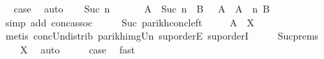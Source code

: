 \begin{isabellebody}
\ \isamarkupfalse%
\ {\isacharquery}{\kern0pt}case\ \isamarkupfalse%
\ auto\isanewline
{}\isamarkupfalse%
\isanewline
\ \ \isamarkupfalse%
\ {\isacharparenleft}{\kern0pt}Suc\ n{\isacharparenright}{\kern0pt}\isanewline
\ \ \isamarkupfalse%
\ \isamarkupfalse%
\ {\isachardoublequoteopen}{\isasymPsi}\ {\isacharparenleft}{\kern0pt}A\ {\isacharcircum}{\kern0pt}{\isacharcircum}{\kern0pt}\ {\isacharparenleft}{\kern0pt}Suc\ n{\isacharparenright}{\kern0pt}\ {\isacharat}{\kern0pt}{\isacharat}{\kern0pt}\ B{\isacharparenright}{\kern0pt}\ {\isasymsubseteq}\ {\isasymPsi}\ {\isacharparenleft}{\kern0pt}A\ {\isacharat}{\kern0pt}{\isacharat}{\kern0pt}\ A\ {\isacharcircum}{\kern0pt}{\isacharcircum}{\kern0pt}\ n\ {\isacharat}{\kern0pt}{\isacharat}{\kern0pt}B{\isacharparenright}{\kern0pt}{\isachardoublequoteclose}\isanewline
\ \ \ \ \isamarkupfalse%
\ {\isacharparenleft}{\kern0pt}simp\ add{\isacharcolon}{\kern0pt}\ conc{\isacharunderscore}{\kern0pt}assoc{\isacharparenright}{\kern0pt}\isanewline
\ \ \isamarkupfalse%
\ \isamarkupfalse%
\ Suc\ parikh{\isacharunderscore}{\kern0pt}conc{\isacharunderscore}{\kern0pt}left\ \isamarkupfalse%
\ {\isachardoublequoteopen}{\isasymdots}\ {\isasymsubseteq}\ {\isasymPsi}\ {\isacharparenleft}{\kern0pt}A\ {\isacharat}{\kern0pt}{\isacharat}{\kern0pt}\ X{\isacharparenright}{\kern0pt}{\isachardoublequoteclose}\isanewline
\ \ \ \ \isamarkupfalse%
\ {\isacharparenleft}{\kern0pt}metis\ conc{\isacharunderscore}{\kern0pt}Un{\isacharunderscore}{\kern0pt}distrib{\isacharparenleft}{\kern0pt}{}{\isacharparenright}{\kern0pt}\ parikh{\isacharunderscore}{\kern0pt}img{\isacharunderscore}{\kern0pt}Un\ sup{\isachardot}{\kern0pt}orderE\ sup{\isachardot}{\kern0pt}orderI{\isacharparenright}{\kern0pt}\isanewline
\ \ \isamarkupfalse%
\ \isamarkupfalse%
\ Suc{\isachardot}{\kern0pt}prems\ \isamarkupfalse%
\ {\isachardoublequoteopen}{\isasymdots}\ {\isasymsubseteq}\ {\isasymPsi}\ X{\isachardoublequoteclose}\ \isamarkupfalse%
\ auto\isanewline
\ \ \isamarkupfalse%
\ \isamarkupfalse%
\ {\isacharquery}{\kern0pt}case\ \isamarkupfalse%
\ fast\isanewline
{}\isamarkupfalse%
%
\endisatagproof
{\isafoldproof}%
%
\isadelimproof
\isanewline
%
\endisadelimproof
\isanewline
{}\isamarkupfalse%

\end{isabellebody}

